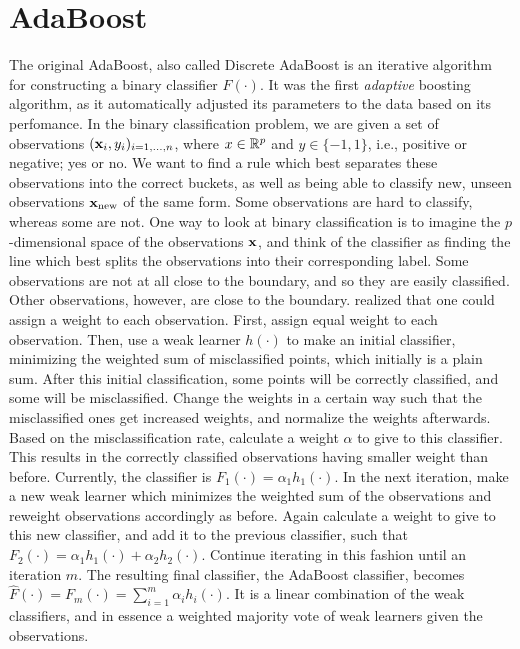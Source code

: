 \section{AdaBoost}
The original AdaBoost, also called Discrete AdaBoost \citep{adaboost} is an iterative algorithm for constructing a binary classifier $F(\cdot)$. It was the first \textit{adaptive} boosting algorithm, as it automatically adjusted its parameters to the data based on its perfomance. In the binary classification problem, we are given a set of observations $(\mathbf{x}_i,y_i)_{i=1,\ldots,n}$, where $x\in\mathbb{R}^p$ and $y\in\{-1,1\}$, i.e., positive or negative; yes or no. We want to find a rule which best separates these observations into the correct buckets, as well as being able to classify new, unseen observations $\mathbf{x}_{\text{new}}$ of the same form. Some observations are hard to classify, whereas some are not. One way to look at binary classification is to imagine the $p$-dimensional space of the observations $\mathbf{x}$, and think of the classifier as finding the line which best splits the observations into their corresponding label. Some observations are not at all close to the boundary, and so they are easily classified. Other observations, however, are close to the boundary. \citet{adaboost} realized that one could assign a weight to each observation. First, assign equal weight to each observation. Then, use a weak learner $h(\cdot)$ to make an initial classifier, minimizing the weighted sum of misclassified points, which initially is a plain sum. After this initial classification, some points will be correctly classified, and some will be misclassified. Change the weights in a certain way such that the misclassified ones get increased weights, and normalize the weights afterwards. Based on the misclassification rate, calculate a weight $\alpha$ to give to this classifier. This results in the correctly classified observations having smaller weight than before. Currently, the classifier is $F_1(\cdot)=\alpha_1h_1(\cdot).$ In the next iteration, make a new weak learner which minimizes the weighted sum of the observations and reweight observations accordingly as before. Again calculate a weight to give to this new classifier, and add it to the previous classifier, such that $F_2(\cdot)=\alpha_1h_1(\cdot)+\alpha_2h_2(\cdot)$. Continue iterating in this fashion until an iteration $m$. The resulting final classifier, the AdaBoost classifier, becomes $\hat{F}(\cdot)=F_m(\cdot)=\sum_{i=1}^m\alpha_ih_i(\cdot)$. It is a linear combination of the weak classifiers, and in essence a weighted majority vote of weak learners given the observations.

